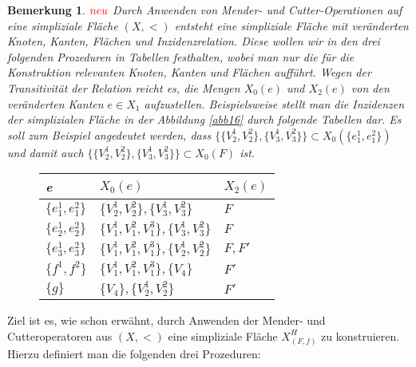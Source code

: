 \documentclass[12pt,titlepage]{article}
\newtheorem{bemerkung}{Bemerkung}[section]
\begin{document}
\begin{bemerkung}
$\textcolor{red}{neu}$ Durch Anwenden von Mender- und Cutter-Operationen auf eine simpliziale Fläche $(X,<)$ entsteht eine simpliziale Fläche mit veränderten Knoten, Kanten, Flächen und Inzidenzrelation. Diese wollen wir in den drei folgenden Prozeduren in Tabellen festhalten, wobei man nur die für die Konstruktion relevanten Knoten, Kanten und Flächen aufführt.  Wegen der Transitivität der Relation reicht es, die Mengen $X_0(e)$ und $X_2(e)$ von den veränderten Kanten $e\in X_1$ aufzustellen.
Beispielsweise stellt man die Inzidenzen der simplizialen Fläche in der Abbildung \ref{abb16} durch folgende Tabellen dar. Es soll zum Beispiel angedeutet werden, dass $\{\{V_2^1,V_2^2\},\{V_3^1,V_3^2\}\}\subset X_0(\{e_1^1,e_1^2\})$ und damit auch $\{\{V_2^1,V_2^2\},\{V_3^1,V_3^2\}\}\subset X_0(F)$ ist.
\begin{figure}[H]
\begin{center}
\begin{tabularx}{\textwidth}{XXX}
\hline
\textbf{e}&\textbf{$X_0(e)$}&\textbf{$X_2(e)$}\\
 \hline
 $\{e_1^1,e_1^2\}$ & $\{V_2^1,V_2^2\},\{V_3^1,V_3^2\}$& $F$\\
  $\{e_2^1,e_2^2\}$&$\{V_1^1,V_1^2,V_1^3\},\{V_3^1,V_3^2\}$ & $F$\\
  $\{e_3^1,e_3^2\}$&$\{V_1^1,V_1^2,V_1^3\},\{V_2^1,V_2^2\}$ & $F,F'$\\ 
   $\{f^1,f^2\}$&$\{V_1^1,V_1^2,V_1^3\},\{V_4\}$& $F'$\\
   $\{g\}$ & $\{V_4\},\{V_2^1,V_2^2\}$ & $F'$ \\

   
 \end{tabularx}
\end{center}
\end{figure}

\end{bemerkung}
Ziel ist es, wie schon erwähnt, durch Anwenden der Mender- und Cutteroperatoren aus $(X,<)$ eine simpliziale Fläche $X^H_{(F,f)}$ zu konstruieren. 
Hierzu definiert man die folgenden drei Prozeduren:\\
\end{document}
